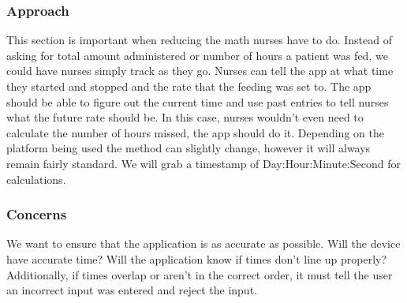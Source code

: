 \documentclass[onecolumn, draftclsnofoot,10pt, compsoc]{IEEEtran}
\begin{document}
\subsubsection{Approach}
This section is important when reducing the math nurses have to do. Instead of asking for total amount administered or number of hours a patient was fed, we could have nurses simply track as they go. Nurses can tell the app at what time they started and stopped and the rate that the feeding was set to. The app should be able to figure out the current time and use past entries to tell nurses what the future rate should be. In this case, nurses wouldn't even need to calculate the number of hours missed, the app should do it. Depending on the platform being used the method can slightly change, however it will always remain fairly standard. We will grab a timestamp of Day:Hour:Minute:Second for calculations. 
\subsubsection{Concerns}
We want to ensure that the application is as accurate as possible. Will the device have accurate time? Will the application know if times don't line up properly? Additionally, if times overlap or aren't in the correct order, it must tell the user an incorrect input was entered and reject the input.
\end{document}
